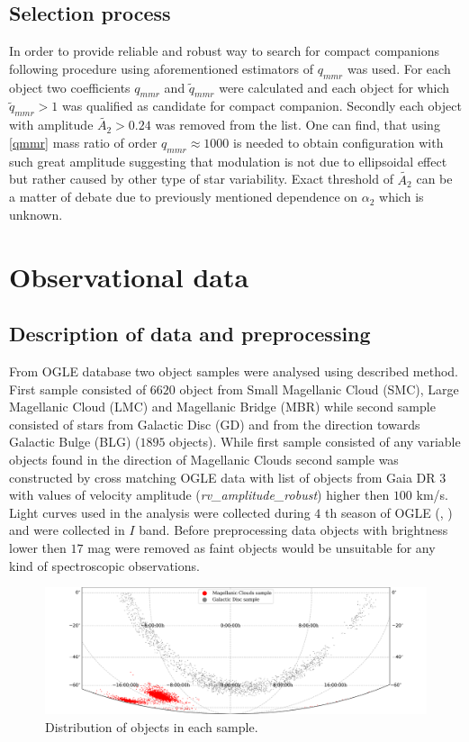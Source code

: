 \documentclass{pracalicmgr}
\begin{document}
\section{Selection process}
In order to provide reliable and robust way to search for compact companions following procedure using aforementioned estimators of $q_{mmr}$ was used.
For each object two coefficients $q_{mmr}$ and $\tilde{q}_{mmr}$ were calculated and each object for which $\tilde{q}_{mmr}>1$ was qualified as candidate for compact companion.
Secondly each object with amplitude $\tilde{A_2}>0.24$ was removed from the list. One can find, that using \ref{qmmr} mass ratio of order $q_{mmr}\approx 1000$ is needed
to obtain configuration with such great amplitude 
suggesting that modulation is not due to ellipsoidal effect but rather caused by other type of star variability. Exact threshold of $\tilde{A_2}$ can be a matter of debate due to 
previously mentioned dependence on $\alpha_2$ which is unknown. 

\chapter{Observational data}
\section{Description of data and preprocessing}
From OGLE database two object samples were analysed using described method. First sample consisted of $6620$ object from Small Magellanic Cloud (SMC), Large Magellanic Cloud (LMC) and 
Magellanic Bridge  (MBR) while second sample consisted of stars from Galactic Disc (GD) and from the direction towards Galactic Bulge (BLG) ($1895$ objects). While first sample consisted 
of any variable objects found in the direction of Magellanic Clouds second sample was constructed by cross matching OGLE data with list of objects from Gaia DR 3 \citep{gaia_collaboration_gaia_2022} with values of 
velocity amplitude ({\it{rv\_amplitude\_robust}}) higher then $100$ km/s. Light curves used in the analysis were collected during $4$ th season of OGLE (\citet*{udalski_ogle-iv_2015},
 \citet*{udalski_optical_1992}) and were collected in $I$ band. Before preprocessing data objects with brightness lower then
$17$ mag  were removed as faint objects would be unsuitable for any kind of spectroscopic observations.
\begin{figure}[H]
    \begin{center}
        \includegraphics[scale=0.52]{plots/map_sample.png}
    \end{center}
    \caption{Distribution of objects in each sample.}
\end{figure}
\end{document}
